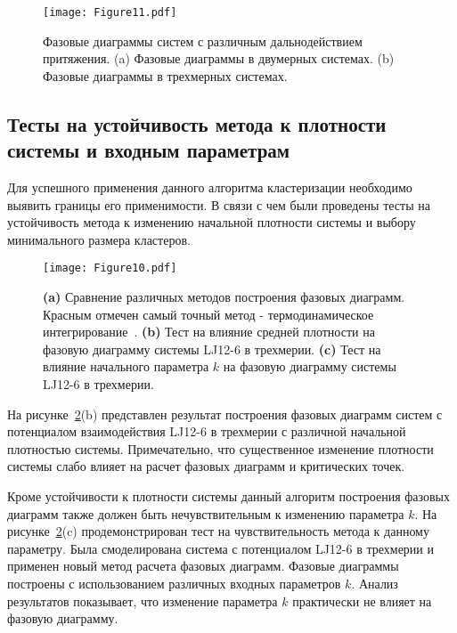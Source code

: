\begin{figure}[!t]
  \centering
  \texttt{[image: Figure11.pdf]}
  \caption{Фазовые диаграммы систем с различным дальнодействием притяжения.
    (a) Фазовые диаграммы в двумерных системах.
    (b) Фазовые диаграммы в трехмерных системах.}
  \label{phase_diagram}
\end{figure}

\subsection{Тесты на устойчивость метода к плотности системы и входным параметрам}
\label{PRIMe-SubSecTests}


Для успешного применения данного алгоритма кластеризации необходимо выявить границы его применимости.
В связи с чем были проведены тесты на устойчивость метода к изменению начальной плотности системы и выбору минимального размера кластеров.

\begin{figure}[!t]
  \centering
  \texttt{[image: Figure10.pdf]}
  \caption{\textbf{(a)} Сравнение различных методов построения фазовых диаграмм.
    Красным отмечен самый точный метод - термодинамическое интегрирование~\cite{10.1080/00268976.2019.1699185}.
    \textbf{(b)} Тест на влияние средней плотности на фазовую диаграмму системы LJ12-6 в трехмерии.
    \textbf{(c)} Тест на влияние начального параметра $k$ на фазовую диаграмму системы LJ12-6 в трехмерии.}
  \label{tests}
\end{figure}



На рисунке~\ref{tests}(b) представлен результат построения фазовых диаграмм систем с потенциалом взаимодействия LJ12-6 в трехмерии с различной начальной плотностью системы.
Примечательно, что существенное изменение плотности системы слабо влияет на расчет фазовых диаграмм и критических точек.



Кроме устойчивости к плотности системы данный алгоритм построения фазовых диаграмм также должен быть нечувствительным к изменению параметра $k$.
На рисунке~\ref{tests}(c) продемонстрирован тест на чувствительность метода к данному параметру.
Была смоделирована система с потенциалом LJ12-6 в трехмерии и применен новый метод расчета фазовых диаграмм.
Фазовые диаграммы построены с использованием различных входных параметров $k$.
Анализ результатов показывает, что изменение параметра $k$ практически не влияет на фазовую диаграмму.


